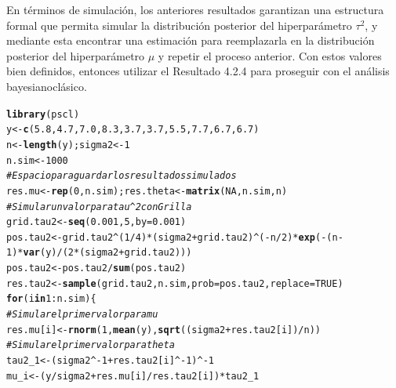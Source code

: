 \documentclass[10pt,openright]{book}\usepackage[]{graphicx}\usepackage[]{color}
\makeatletter
\newcommand{\hlnum}[1]{\textcolor[rgb]{0.686,0.059,0.569}{#1}}%
\newcommand{\hlcom}[1]{\textcolor[rgb]{0.678,0.584,0.686}{\textit{#1}}}%
\newcommand{\hlopt}[1]{\textcolor[rgb]{0,0,0}{#1}}%
\newcommand{\hlstd}[1]{\textcolor[rgb]{0.345,0.345,0.345}{#1}}%
\newcommand{\hlkwa}[1]{\textcolor[rgb]{0.161,0.373,0.58}{\textbf{#1}}}%
\newcommand{\hlkwb}[1]{\textcolor[rgb]{0.69,0.353,0.396}{#1}}%
\newcommand{\hlkwc}[1]{\textcolor[rgb]{0.333,0.667,0.333}{#1}}%
\newcommand{\hlkwd}[1]{\textcolor[rgb]{0.737,0.353,0.396}{\textbf{#1}}}%
\newenvironment{kframe}{%
 \def\at@end@of@kframe{}%
 \ifinner\ifhmode%
  \def\at@end@of@kframe{\end{minipage}}%
  \begin{minipage}{\columnwidth}%
 \fi\fi%
 \def\FrameCommand##1{\hskip\@totalleftmargin \hskip-\fboxsep
 \colorbox{shadecolor}{##1}\hskip-\fboxsep
     \hskip-\linewidth \hskip-\@totalleftmargin \hskip\columnwidth}%
 \MakeFramed {\advance\hsize-\width
   \@totalleftmargin\z@ \linewidth\hsize
   \@setminipage}}%
 {\par\unskip\endMakeFramed%
 \at@end@of@kframe}
\newenvironment{knitrout}{}{} %
\makeatother
\begin{document}
En t\'erminos de simulaci\'on, los anteriores resultados garantizan una estructura formal que permita simular la distribuci\'on posterior del hiperpar\'ametro $\tau^2$, y mediante esta encontrar una estimaci\'on para reemplazarla en la distribuci\'on posterior del hiperpar\'ametro $\mu$ y repetir el proceso anterior. Con estos valores bien definidos, entonces utilizar el Resultado 4.2.4 para proseguir con el an\'alisis bayesianocl\'asico. 
\begin{knitrout}
\color{fgcolor}\begin{kframe}
\begin{alltt}
\hlkwd{library}\hlstd{(pscl)}
\hlstd{y} \hlkwb{<-} \hlkwd{c}\hlstd{(}\hlnum{5.8}\hlstd{,} \hlnum{4.7}\hlstd{,} \hlnum{7.0}\hlstd{,} \hlnum{8.3}\hlstd{,} \hlnum{3.7}\hlstd{,} \hlnum{3.7}\hlstd{,} \hlnum{5.5}\hlstd{,} \hlnum{7.7}\hlstd{,} \hlnum{6.7}\hlstd{,} \hlnum{6.7}\hlstd{)}
\hlstd{n} \hlkwb{<-} \hlkwd{length}\hlstd{(y); sigma2} \hlkwb{<-} \hlnum{1}
\hlstd{n.sim} \hlkwb{<-} \hlnum{1000}
\hlcom{# Espacio para guardar los resultados simulados}
\hlstd{res.mu} \hlkwb{<-} \hlkwd{rep}\hlstd{(}\hlnum{0}\hlstd{, n.sim); res.theta} \hlkwb{<-} \hlkwd{matrix}\hlstd{(}\hlnum{NA}\hlstd{, n.sim, n)}
\hlcom{# Simular un valor para tau^2 con Grilla}
\hlstd{grid.tau2} \hlkwb{<-} \hlkwd{seq}\hlstd{(}\hlnum{0.001}\hlstd{,}\hlnum{5}\hlstd{,}\hlkwc{by}\hlstd{=}\hlnum{0.001}\hlstd{)}
\hlstd{pos.tau2} \hlkwb{<-} \hlstd{grid.tau2}\hlopt{^}\hlstd{(}\hlnum{1}\hlopt{/}\hlnum{4}\hlstd{)}\hlopt{*}\hlstd{(sigma2}\hlopt{+}\hlstd{grid.tau2)}\hlopt{^}\hlstd{(}\hlopt{-}\hlstd{n}\hlopt{/}\hlnum{2}\hlstd{)}\hlopt{*}\hlkwd{exp}\hlstd{(}\hlopt{-}\hlstd{(n}\hlopt{-}\hlnum{1}\hlstd{)}\hlopt{*}\hlkwd{var}\hlstd{(y)}\hlopt{/}\hlstd{(}\hlnum{2}\hlopt{*}\hlstd{(sigma2}\hlopt{+}\hlstd{grid.tau2)))}
\hlstd{pos.tau2} \hlkwb{<-} \hlstd{pos.tau2}\hlopt{/}\hlkwd{sum}\hlstd{(pos.tau2)}
\hlstd{res.tau2} \hlkwb{<-} \hlkwd{sample}\hlstd{(grid.tau2, n.sim,} \hlkwc{prob}\hlstd{=pos.tau2,} \hlkwc{replace}\hlstd{=}\hlnum{TRUE}\hlstd{)}
\hlkwa{for}\hlstd{(i} \hlkwa{in} \hlnum{1}\hlopt{:}\hlstd{n.sim)\{}
  \hlcom{# Simular el primer valor para mu}
  \hlstd{res.mu[i]} \hlkwb{<-} \hlkwd{rnorm}\hlstd{(}\hlnum{1}\hlstd{,} \hlkwd{mean}\hlstd{(y),} \hlkwd{sqrt}\hlstd{((sigma2}\hlopt{+}\hlstd{res.tau2[i])}\hlopt{/}\hlstd{n))}
  \hlcom{# Simular el primer valor para theta}
  \hlstd{tau2_1} \hlkwb{<-} \hlstd{(sigma2}\hlopt{^-}\hlnum{1} \hlopt{+} \hlstd{res.tau2[i]}\hlopt{^-}\hlnum{1}\hlstd{)}\hlopt{^-}\hlnum{1}
  \hlstd{mu_i} \hlkwb{<-} \hlstd{(y}\hlopt{/}\hlstd{sigma2} \hlopt{+} \hlstd{res.mu[i]}\hlopt{/}\hlstd{res.tau2[i])}\hlopt{*}\hlstd{tau2_1}

\end{alltt}
\end{kframe}
\end{knitrout}
\end{document}
